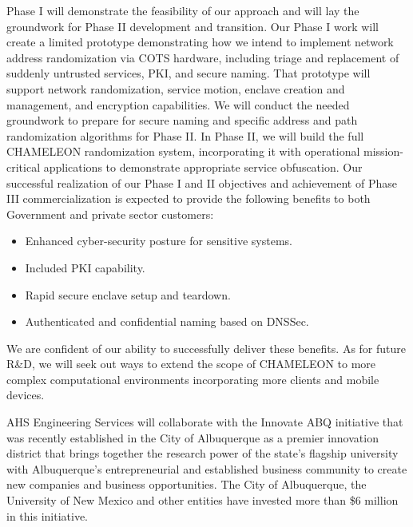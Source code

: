 \documentclass{sbir}
\begin{document}
Phase I will demonstrate the feasibility of our approach and will lay the groundwork for Phase II development and transition. Our Phase I work will create a limited prototype demonstrating how we intend to implement network address randomization via COTS hardware, including triage and replacement of suddenly untrusted services, PKI, and secure naming. That prototype will support network randomization, service motion, enclave creation and management, and encryption capabilities. We will conduct the needed groundwork to prepare for secure naming and specific address and path randomization algorithms for Phase II. In Phase II, we will build the full CHAMELEON randomization system, incorporating it with operational mission-critical applications to demonstrate appropriate service obfuscation. Our successful realization of our Phase I and II objectives and achievement of Phase III commercialization is expected to provide the following benefits to both Government and private sector customers:

\vspace{-0.1in}
\begin{itemize}
     \item Enhanced cyber-security posture for sensitive systems.
     \item Included PKI capability.
     \item Rapid secure enclave setup and teardown.
     \item Authenticated and confidential naming based on DNSSec.
\end{itemize}

We are confident of our ability to successfully deliver these benefits. As for future R\&D, we will seek out ways to extend the scope of CHAMELEON to more complex computational environments incorporating more clients and mobile devices.

\label{commercialization}
AHS Engineering Services will collaborate with the Innovate ABQ initiative that was recently established in the City of Albuquerque as a premier innovation district that brings together the research power of the state's flagship university with Albuquerque's entrepreneurial and established business community to create new companies and business opportunities. The City of Albuquerque, the University of New Mexico and other entities have invested more than \$6 million in this initiative.  
\end{document}
